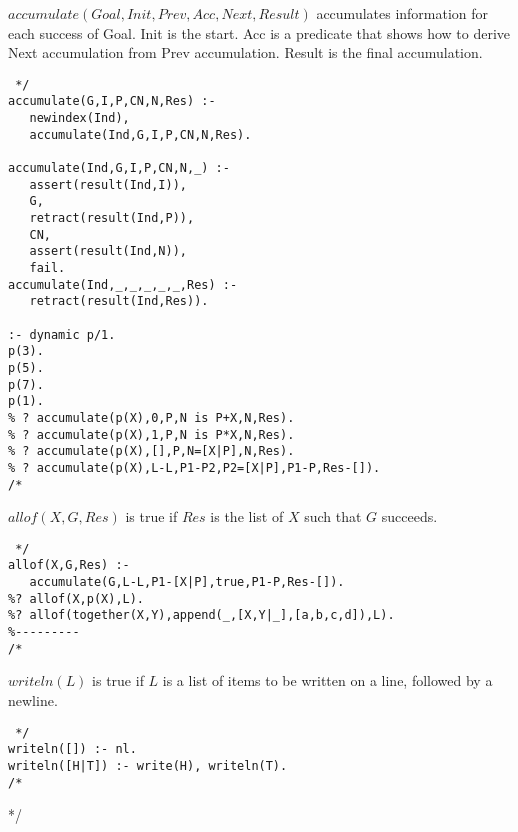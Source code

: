 $accumulate(Goal,Init,Prev,Acc,Next,Result)$ accumulates information for each success of Goal. Init is the start. Acc is a predicate that shows how to derive Next accumulation from Prev accumulation. Result is the final accumulation.

\begin{verbatim} */
accumulate(G,I,P,CN,N,Res) :-
   newindex(Ind),
   accumulate(Ind,G,I,P,CN,N,Res).

accumulate(Ind,G,I,P,CN,N,_) :-
   assert(result(Ind,I)),
   G,
   retract(result(Ind,P)),
   CN,
   assert(result(Ind,N)),
   fail.
accumulate(Ind,_,_,_,_,_,Res) :-
   retract(result(Ind,Res)).

:- dynamic p/1.
p(3).
p(5).
p(7).
p(1).
% ? accumulate(p(X),0,P,N is P+X,N,Res).
% ? accumulate(p(X),1,P,N is P*X,N,Res).
% ? accumulate(p(X),[],P,N=[X|P],N,Res).
% ? accumulate(p(X),L-L,P1-P2,P2=[X|P],P1-P,Res-[]).
/* \end{verbatim}

$allof(X,G,Res)$ is true if $Res$ is the list of $X$ such that $G$ succeeds.
\begin{verbatim} */
allof(X,G,Res) :-
   accumulate(G,L-L,P1-[X|P],true,P1-P,Res-[]).
%? allof(X,p(X),L).
%? allof(together(X,Y),append(_,[X,Y|_],[a,b,c,d]),L).
%---------
/* \end{verbatim}

$writeln(L)$ is true if $L$ is a list of items to be written on a line, followed by a newline.
\begin{verbatim} */
writeln([]) :- nl.
writeln([H|T]) :- write(H), writeln(T).
/* \end{verbatim}
*/
